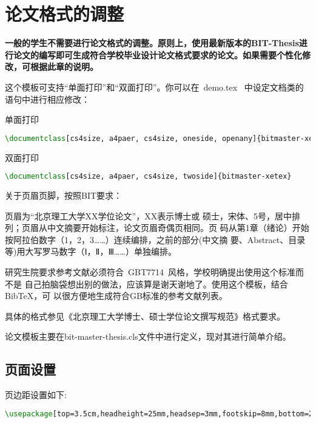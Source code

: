 

\chapter{论文格式的调整}
\label{sec:thesisformat}

\textbf{一般的学生不需要进行论文格式的调整。原则上，使用最新版本的BIT-Thesis进行论文的编写即可生成符合学校毕业设计论文格式要求的论文。如果需要个性化修改，可根据此章的说明。
}

这个模板可支持``单面打印''和``双面打印''。你可以在~demo.tex~
中设定文档类的语句中进行相应修改：

单面打印
\begin{lstlisting}[language={TeX}]
\documentclass[cs4size, a4paer, cs4size, oneside, openany]{bitmaster-xetex}

\end{lstlisting}

双面打印
\begin{lstlisting}[language={TeX}]
\documentclass[cs4size, a4paer, cs4size, twoside]{bitmaster-xetex}

\end{lstlisting}

关于页眉页脚，按照BIT要求：

页眉为``北京理工大学XX学位论文''，XX表示博士或
硕士，宋体、5号，居中排列；页眉从中文摘要开始标注，论文页眉奇偶页相同。页
码从第1章（绪论）开始按阿拉伯数字（1，2，3……）连续编排，之前的部分(中文摘
要、Abstract、目录等)用大写罗马数字（Ⅰ，Ⅱ，Ⅲ……）单独编排。

研究生院要求参考文献必须符合~GBT7714~风格，学校明确提出使用这个标准而不是
自己拍脑袋想出别的做法，应该算是谢天谢地了。使用这个模板，结合BibTeX，可
以很方便地生成符合GB标准的参考文献列表。

具体的格式参见《北京理工大学博士、硕士学位论文撰写规范》格式要求。

论文模板主要在bit-master-thesis.cls文件中进行定义，现对其进行简单介绍。
\section{页面设置}
页边距设置如下:
\begin{lstlisting}[language={TeX}]
\usepackage[top=3.5cm,headheight=25mm,headsep=3mm,footskip=8mm,bottom=2.5cm,left=2.7cm,right=2.7cm]{geometry}

\end{lstlisting}

